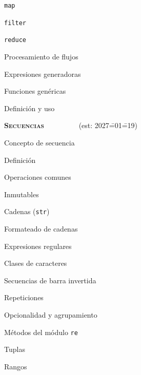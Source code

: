 \begin{longenum}
\begin{longenum}
\begin{longenum}
            \item \texttt{map}
            \item \texttt{filter}
            \item \texttt{reduce}
            \item Procesamiento de flujos
            \item Expresiones generadoras
        \end{longenum}
        \item Funciones genéricas
        \begin{longenum}
            \item Definición y uso
        \end{longenum}
    \end{longenum}
    \item \textbf{\textsc{Secuencias}} \ \ \ \ \ \ \ \ \ (est: 2027\==01\==19)
    \begin{longenum}
        \item Concepto de secuencia
        \begin{longenum}
            \item Definición
            \item Operaciones comunes
        \end{longenum}
        \item Inmutables
        \begin{longenum}
            \item Cadenas (\texttt{str})
            \begin{longenum}
                \item Formateado de cadenas
                \item Expresiones regulares
                \begin{longenum}
                    \item Clases de caracteres
                    \item Secuencias de barra invertida
                    \item Repeticiones
                    \item Opcionalidad y agrupamiento
                    \item Métodos del módulo \texttt{re}
                \end{longenum}
            \end{longenum}
            \item Tuplas
            \item Rangos

\end{longenum}
\end{longenum}
\end{longenum}
